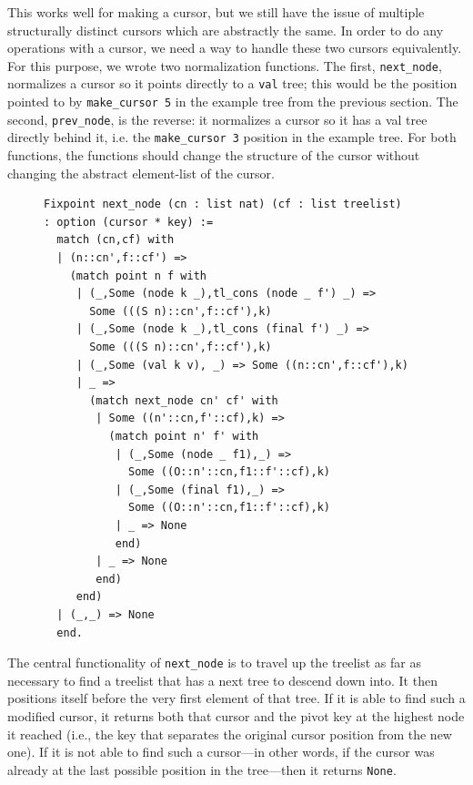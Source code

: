 \documentclass[a4paper,12pt]{article}
\begin{document}
This works well for making a cursor, but we still have the issue of multiple structurally distinct cursors which are abstractly the same. In order to do any operations with a cursor, we need a way to handle these two cursors equivalently. For this purpose, we wrote two normalization functions. The first, \texttt{next\_node}, normalizes a cursor so it points directly to a \texttt{val} tree; this would be the position pointed to by \texttt{make\_cursor 5} in the example tree from the previous section. The second, \texttt{prev\_node}, is the reverse: it normalizes a cursor so it has a val tree directly behind it, i.e. the \texttt{make\_cursor 3} position in the example tree. For both functions, the functions should change the structure of the cursor without changing the abstract element-list of the cursor.

\begin{figure}[h]
\begin{singlespace}
\begin{verbatim}
Fixpoint next_node (cn : list nat) (cf : list treelist)
: option (cursor * key) :=
  match (cn,cf) with
  | (n::cn',f::cf') =>
    (match point n f with
     | (_,Some (node k _),tl_cons (node _ f') _) =>
       Some (((S n)::cn',f::cf'),k)
     | (_,Some (node k _),tl_cons (final f') _) =>
       Some (((S n)::cn',f::cf'),k)
     | (_,Some (val k v), _) => Some ((n::cn',f::cf'),k)
     | _ =>
       (match next_node cn' cf' with
        | Some ((n'::cn,f'::cf),k) =>
          (match point n' f' with
           | (_,Some (node _ f1),_) =>
             Some ((O::n'::cn,f1::f'::cf),k)
           | (_,Some (final f1),_) =>
             Some ((O::n'::cn,f1::f'::cf),k)
           | _ => None
           end)
        | _ => None
        end)
     end)
  | (_,_) => None
  end.
\end{verbatim}
\end{singlespace}
\end{figure}

The central functionality of \texttt{next\_node} is to travel up the treelist as far as necessary to find a treelist that has a next tree to descend down into. It then positions itself before the very first element of that tree. If it is able to find such a modified cursor, it returns both that cursor and the pivot key at the highest node it reached (i.e., the key that separates the original cursor position from the new one). If it is not able to find such a cursor---in other words, if the cursor was already at the last possible position in the tree---then it returns \texttt{None}.
\end{document}
